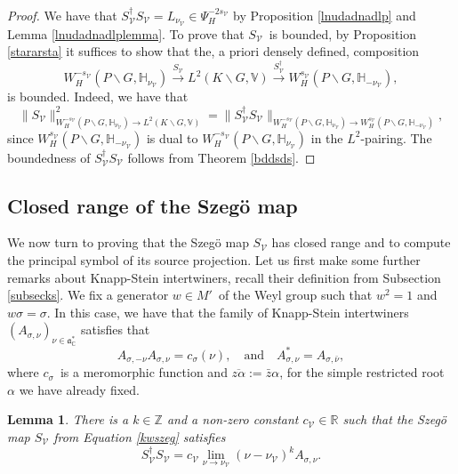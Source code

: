 \documentclass[a4paper,reqno]{amsart}
\numberwithin{equation}{section}
\def\C{\mathbb{C}}
\def\R{\mathbb{R}}
\def\Z{\mathbb{Z}}
\newtheorem{lemma}[thm]{Lemma}
\theoremstyle{definition}
\theoremstyle{remark}
\begin{document}
\begin{proof}
We have that $S_{\mathcal{V}}^\dagger S_{\mathcal{V}}=L_{\nu_{\mathcal{V}}}\in \Psi^{-2s_\mathcal{V}}_H$ by Proposition \ref{lnudadnadlp} and Lemma \ref{lnudadnadlplemma}. To prove that $S_{\mathcal{V}}$ is bounded, by Proposition \ref{stararsta} it suffices to show that the, a priori densely defined, composition 
$$W^{-s_\mathcal{V}}_{H}(P\backslash G, \mathbb{H}_{\nu_{\mathcal{V}}})\xrightarrow{S_{\mathcal{V}}} L^2(K \backslash G,\mathbb{V})\xrightarrow{S_{\mathcal{V}}^\dagger }W^{s_\mathcal{V}}_{H}(P\backslash G, \mathbb{H}_{-\nu_{\mathcal{V}}}),$$
is bounded. Indeed, we have that 
$$\|S_{\mathcal{V}}\|_{W^{-s_\mathcal{V}}_{H}(P\backslash G, \mathbb{H}_{\nu_{\mathcal{V}}})\to L^2(K \backslash G,\mathbb{V})}^2=\|S_{\mathcal{V}}^\dagger S_{\mathcal{V}}\|_{W^{-s_\mathcal{V}}_{H}(P\backslash G, \mathbb{H}_{\nu_{\mathcal{V}}})\to W^{s_\mathcal{V}}_{H}(P\backslash G, \mathbb{H}_{-\nu_{\mathcal{V}}})},$$ 
since $W^{s_\mathcal{V}}_{H}(P\backslash G, \mathbb{H}_{-\nu_{\mathcal{V}}})$ is dual to $W^{-s_\mathcal{V}}_{H}(P\backslash G, \mathbb{H}_{\nu_{\mathcal{V}}})$ in the $L^2$-pairing. The boundedness of $S_{\mathcal{V}}^\dagger S_{\mathcal{V}}$ follows from Theorem \ref{bddsds}. 
\end{proof}

\subsection{Closed range of the Szegö map}
\label{lknlnad}

We now turn to proving that the Szegö map $S_{\mathcal{V}}$ has closed range and to compute the principal symbol of its source projection. Let us first make some further remarks about Knapp-Stein intertwiners, recall their definition from Subsection \ref{subsecks}. We fix a generator $w\in M'$ of the Weyl group such that $w^2=1$ and $w\sigma=\sigma$. In this case, we have that the family of Knapp-Stein intertwiners $(A_{\sigma,\nu})_{\nu\in \mathfrak{a}_\C^*}$ satisfies that 
\begin{equation} 
\label{someidedadadn}
A_{\sigma,-\nu}A_{\sigma,\nu}=c_\sigma(\nu), \quad\mbox{and}\quad A_{\sigma,\nu}^*=A_{\sigma,\bar{\nu}},
\end{equation}
where $c_\sigma$ is a meromorphic function and $\overline{z\alpha}:=\bar{z}\alpha$, for the simple restricted root $\alpha$ we have already fixed. 


\begin{lemma}
\label{nkjbnadap}
There is a $k\in \Z$ and a non-zero constant $c_{\mathcal{V}}\in \R$ such that the Szegö map $S_{\mathcal{V}}$ from Equation \eqref{kwszeg} satisfies 
$$S_{\mathcal{V}}^\dagger S_{\mathcal{V}}=c_{\mathcal{V}}\lim_{\nu\to \nu_{\mathcal{V}}}(\nu-\nu_{\mathcal{V}})^kA_{\sigma,\nu}.$$
\end{lemma}
\end{document}
